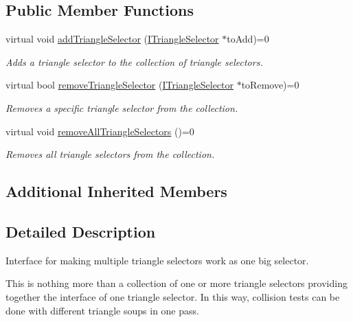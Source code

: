 \subsection*{Public Member Functions}
\begin{DoxyCompactItemize}
\item 
virtual void \hyperlink{classirr_1_1scene_1_1IMetaTriangleSelector_afb19b5f7cbf37d202b09c126417f9a83}{add\+Triangle\+Selector} (\hyperlink{classirr_1_1scene_1_1ITriangleSelector}{I\+Triangle\+Selector} $\ast$to\+Add)=0
\begin{DoxyCompactList}\small\item\em Adds a triangle selector to the collection of triangle selectors. \end{DoxyCompactList}\item 
virtual bool \hyperlink{classirr_1_1scene_1_1IMetaTriangleSelector_ac1534f0bb8bb24a196ae262f3a80f32d}{remove\+Triangle\+Selector} (\hyperlink{classirr_1_1scene_1_1ITriangleSelector}{I\+Triangle\+Selector} $\ast$to\+Remove)=0
\begin{DoxyCompactList}\small\item\em Removes a specific triangle selector from the collection. \end{DoxyCompactList}\item 
\mbox{\label{classirr_1_1scene_1_1IMetaTriangleSelector_a4137793b61aed8cc8e60f8362feba939}} 
virtual void \hyperlink{classirr_1_1scene_1_1IMetaTriangleSelector_a4137793b61aed8cc8e60f8362feba939}{remove\+All\+Triangle\+Selectors} ()=0
\begin{DoxyCompactList}\small\item\em Removes all triangle selectors from the collection. \end{DoxyCompactList}\end{DoxyCompactItemize}
\subsection*{Additional Inherited Members}


\subsection{Detailed Description}
Interface for making multiple triangle selectors work as one big selector. 

This is nothing more than a collection of one or more triangle selectors providing together the interface of one triangle selector. In this way, collision tests can be done with different triangle soups in one pass. 

